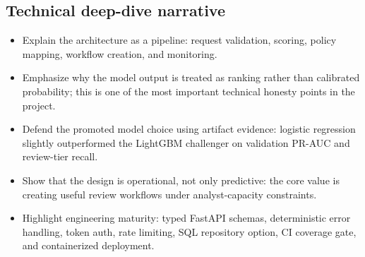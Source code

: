 \documentclass[11pt]{article}
\begin{document}
\subsection*{Technical deep-dive narrative}
\begin{itemize}
  \item Explain the architecture as a pipeline: request validation, scoring, policy mapping, workflow creation, and monitoring.
  \item Emphasize why the model output is treated as ranking rather than calibrated probability; this is one of the most important technical honesty points in the project.
  \item Defend the promoted model choice using artifact evidence: logistic regression slightly outperformed the LightGBM challenger on validation PR-AUC and review-tier recall.
  \item Show that the design is operational, not only predictive: the core value is creating useful review workflows under analyst-capacity constraints.
  \item Highlight engineering maturity: typed FastAPI schemas, deterministic error handling, token auth, rate limiting, SQL repository option, CI coverage gate, and containerized deployment.
\end{itemize}
\end{document}
